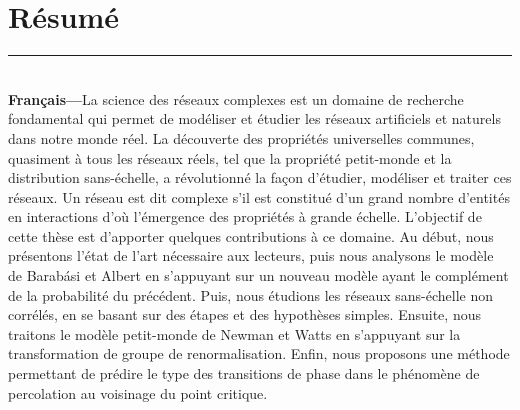 \documentclass[a4paper,12pt]{book}
\theoremstyle{break}
\begin{document}
\chapter*{Résumé}
\noindent\rule[2pt]{\textwidth}{0.5pt}\\
{\large\textbf{Français---}}La science des réseaux complexes est un domaine de recherche fondamental qui permet de modéliser et étudier les réseaux artificiels et naturels dans notre monde réel. La découverte
des propriétés universelles communes, quasiment à tous les réseaux réels, tel que la propriété petit-monde et la distribution sans-échelle, a révolutionné la façon
d’étudier, modéliser et traiter ces réseaux.
Un réseau est dit complexe s'il est constitué d'un grand nombre d'entités en interactions d’où l’émergence
des propriétés à grande échelle. L'objectif de cette thèse est d'apporter quelques contributions à ce domaine. Au début, nous présentons l’état de l’art nécessaire aux lecteurs, puis nous analysons
le modèle de Barabási et Albert en s'appuyant sur un nouveau modèle ayant le complément de la probabilité du précédent. Puis, nous étudions les réseaux sans-échelle non corrélés, en se basant sur des étapes et des hypothèses simples.
Ensuite, nous traitons le modèle petit-monde de Newman et Watts en s'appuyant sur la transformation de groupe de renormalisation.
Enfin, nous proposons une méthode permettant de prédire le type des transitions de phase  dans le phénomène de percolation au voisinage du point critique.
\end{document}
